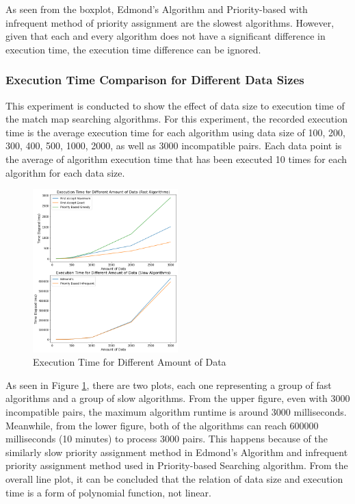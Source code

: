 \documentclass[conference]{IEEEtran}
\begin{document}
As seen from the boxplot, Edmond's Algorithm and Priority-based with infrequent method of priority assignment are the slowest
algorithms. However, given that each and every algorithm does not have a significant difference in execution time, the execution
time difference can be ignored.

\subsubsection{Execution Time Comparison for Different Data Sizes}
This experiment is conducted to show the effect of data size to execution time of the match map searching algorithms. For this
experiment, the recorded execution time is the average execution time for each algorithm using data size of  100, 200, 300, 400,
500, 1000, 2000, as well as 3000 incompatible pairs. Each data point is the average of algorithm execution time that has been
executed 10 times for each algorithm for each data size.

\begin{figure}[h]
    \includegraphics[width=0.5\textwidth]{images/execution_time_for_different_amount_of_data.png}
    \caption{Execution Time for Different Amount of Data}
    \label{exctimedata}
\end{figure}

As seen in Figure \ref{exctimedata}, there are two plots, each one representing a group of fast algorithms and a group of slow algorithms.
From the upper figure, even with 3000 incompatible pairs, the maximum algorithm runtime is around 3000 milliseconds. Meanwhile,
from the lower figure, both of the algorithms can reach 600000 milliseconds (10 minutes) to process 3000 pairs. This happens
because of the similarly slow priority assignment method in Edmond's Algorithm and infrequent priority assignment method used in
Priority-based Searching algorithm. From the overall line plot, it can be concluded that the relation of data size and execution
time is a form of polynomial function, not linear.
\end{document}
